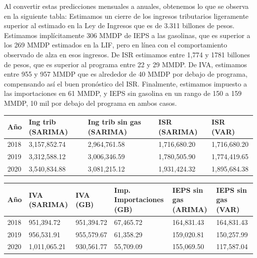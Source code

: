 \documentclass[a4paper, 11pt]{article}
\begin{document}
Al convertir estas predicciones mensuales a anuales, obtenemos lo que se observa en la siguiente tabla: Estimamos un cierre de los ingresos tributarios ligeramente superior al estimado en la Ley de Ingresos que es de 3.311 billones de pesos. Estimamos implícitamente 306 MMDP de IEPS a las gasolinas, que es superior a los 269 MMDP estimados en la LIF, pero en línea con el comportamiento observado de alza en esos ingresos. De ISR estimamos entre 1,774 y 1781 billones de pesos, que es superior al programa entre 22 y 29 MMDP. De IVA, estimamos entre 955 y 957  MMDP que es alrededor de 40 MMDP por debajo de programa, compensando así el buen pronóstico del ISR. Finalmente, estimamos impuesto a las importaciones en 61 MMDP, y IEPS sin gasolina en un rango de 150 a 159 MMDP, 10 mil por debajo del programa en ambos casos. 
\begin{table}
\begin{tabular}{p{3em}p{3em}p{3em}p{3em}p{3em}}
\multicolumn{1}{p{6.415em}}{\textbf{Año}} & \multicolumn{1}{p{6.415em}}{\textbf{Ing trib (SARIMA)}} & \multicolumn{1}{p{6.415em}}{\textbf{Ing trib sin gas (SARIMA)}} & \multicolumn{1}{p{6.415em}}{\textbf{ISR (SARIMA)}} & \multicolumn{1}{p{6.415em}}{\textbf{ISR (VAR)}} \\ \hline \hline
2018 & 3,157,852.74  & 2,964,761.58  & 1,716,680.20  & 1,716,680.20  \\ \hline
2019 & 3,312,588.12  & 3,006,346.59  &  1,780,505.90  & 1,774,419.65   \\ \hline
2020 & 3,540,834.88  & 3,081,215.12  &  1,931,424.32  &  1,895,684.38  \\ \hline \hline
\end{tabular}%
\end{table}
\begin{table}[h]
\begin{tabular}{p{3em}p{3em}p{3em}p{3em}p{3em}p{3em}}
\multicolumn{1}{p{6.415em}}{\textbf{Año}}& \multicolumn{1}{p{6.415em}}{\textbf{IVA (SARIMA)}} & \multicolumn{1}{p{6.415em}}{\textbf{IVA (GB)}} & \multicolumn{1}{p{6.415em}}{\textbf{Imp. Importaciones (GB)}} & \multicolumn{1}{p{6.415em}}{\textbf{IEPS sin gas (ARIMA)}} & \multicolumn{1}{p{6.415em}}{\textbf{IEPS sin gas (VAR)}} \\ \hline \hline
2018 & 951,394.72  &           951,394.72  &              67,465.72  &           164,831.43  &           164,831.43  \\ \hline
2019 & 956,531.91  &           955,579.67  &              61,358.29  &           159,020.81  &           150,257.99  \\ \hline
2020 & 1,011,065.21  &           930,561.77  &              55,709.09  &           155,069.50  &           117,587.04  \\ \hline \hline
\end{tabular}%
\end{table}
\end{document}
